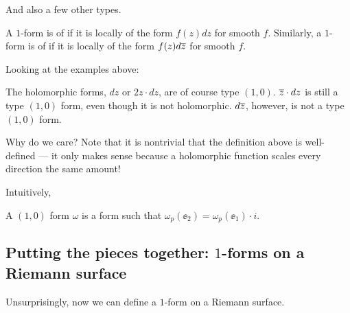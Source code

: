 And also a few other types.
\begin{definition}
	A $1$-form is of  if it is locally of the form $f(z) dz$ for smooth $f$.
	Similarly, a $1$-form is of  if it is locally of the form $f(z) d \overline z$
	for smooth $f$.
\end{definition}
\begin{example}
	Looking at the examples above:
	\begin{itemize}
		\ii The holomorphic forms, $dz$ or $2z \cdot dz$, are of course type $(1, 0)$.
		\ii $\overline z \cdot dz$ is still a type $(1, 0)$ form, even though it is not holomorphic.
		\ii $d \overline z$, however, is not a type $(1, 0)$ form.
	\end{itemize}
\end{example}
Why do we care? Note that it is nontrivial that the definition above is well-defined --- it only
makes sense because a holomorphic function scales every direction the same amount!

Intuitively,
\begin{moral}
	A $(1, 0)$ form $\omega$ is a form such that $\omega_p(\ee_2) = \omega_p(\ee_1) \cdot i$.
\end{moral}

\subsection{Putting the pieces together: $1$-forms on a Riemann surface}

Unsurprisingly, now we can define a $1$-form on a Riemann surface.
